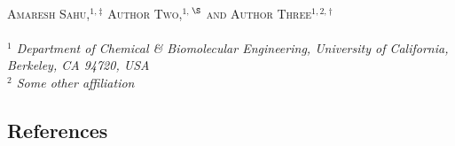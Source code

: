\documentclass[11pt,twoside,notitlepage,]{article}
\begin{document}
	\allsectionsfont{\sffamily}
	\thispagestyle{empty}




	\\[15pt]
	{\small\textsc{%
		Amaresh Sahu,$^{1,}$\hyperlink{email1}{$^{\ddag}$}
		Author Two,$^{1,}$\hyperlink{email2}{$^{\S}$}
		and Author Three$^{1,2,}$\hyperlink{email3}{$^{\dag}$} \\
	}}
	\\[0pt]
	{\footnotesize%
		{%
			\noindent
			\textit{$^1$%
			Department of Chemical \& Biomolecular Engineering,
			University of California, Berkeley, CA 94720, USA}
			\\[3pt]
			\textit{$^2$%
			Some other affiliation}
		}
	}
	\\[-20pt]
	\begin{abstract}
		\noindent Dated: \today
		\\[15pt]
		\noindent\textsf{\textbf{Abstract.}} Abstract goes here.
		\lipsum[1]
	\end{abstract}




	\normalsize
	\begin{multicols*}{2}

		




		\section*{References}

		\small

		
		
	\end{multicols*}
\end{document}
